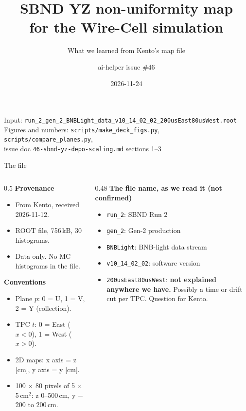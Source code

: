\documentclass[aspectratio=169,10pt]{beamer}
\title{SBND YZ non-uniformity map\\for the Wire-Cell simulation}
\subtitle{What we learned from Kento's map file}
\author{ai-helper issue \#46}
\date{2026-11-24}
\newcommand{\open}[1]{\textcolor{open}{\textbf{#1}}}
\newcommand{\code}[1]{\texttt{#1}}
\begin{document}
\begin{frame}
\titlepage
\vspace{-6mm}
\begin{center}\footnotesize\color{gray}
Input: \code{run\_2\_gen\_2\_BNBLight\_data\_v10\_14\_02\_02\_200usEast80usWest.root}\\
Figures and numbers: \code{scripts/make\_deck\_figs.py}, \code{scripts/compare\_planes.py},\\
issue doc \code{46-sbnd-yz-depo-scaling.md} sections 1--3
\end{center}
\end{frame}

\begin{frame}{The file}
\begin{columns}[T]
\begin{column}{0.5\textwidth}
\textbf{Provenance}
\begin{itemize}
\item From Kento, received 2026-11-12.
\item ROOT file, 756\,kB, 30 histograms.
\item Data only. No MC histograms in the file.
\end{itemize}
\vspace{3mm}
\textbf{Conventions}
\begin{itemize}
\item Plane $p$: 0 = U, 1 = V, 2 = Y (collection).
\item TPC $t$: 0 = East ($x<0$), 1 = West ($x>0$).
\item 2D maps: x axis = z [cm], y axis = y [cm].
\item 100 $\times$ 80 pixels of 5 $\times$ 5\,cm$^2$: z 0--500\,cm, y $-$200 to 200\,cm.
\end{itemize}
\end{column}
\begin{column}{0.48\textwidth}
\textbf{The file name, as we read it (not confirmed)}
\begin{itemize}
\item \code{run\_2}: SBND Run 2
\item \code{gen\_2}: Gen-2 production
\item \code{BNBLight}: BNB-light data stream
\item \code{v10\_14\_02\_02}: software version
\item \code{200usEast80usWest}: \open{not explained anywhere we have.} Possibly a time or drift cut per TPC. Question for Kento.
\end{itemize}
\end{column}
\end{columns}
\end{frame}
\end{document}
